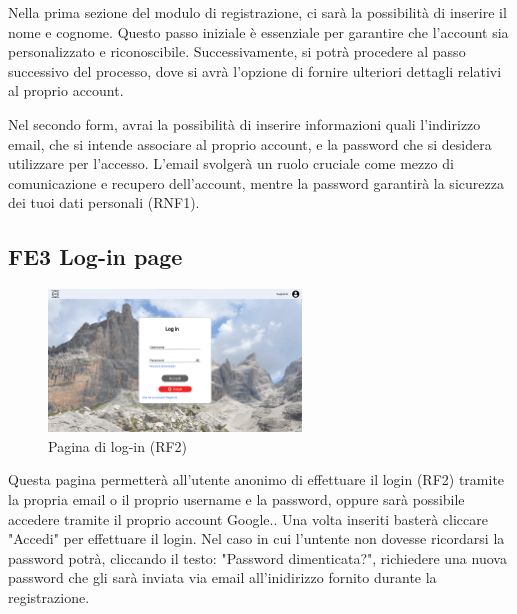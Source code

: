 \documentclass[a4paper,12pt]{article}
\begin{document}
Nella prima sezione del modulo di registrazione, ci sarà la possibilità di inserire il nome e cognome. Questo passo iniziale è essenziale per garantire che l'account sia personalizzato e riconoscibile. Successivamente, si potrà procedere al passo successivo del processo, dove si avrà l'opzione di fornire ulteriori dettagli relativi al proprio account.

Nel secondo form, avrai la possibilità di inserire informazioni quali l'indirizzo email, che si intende associare al proprio account, e la password che si desidera utilizzare per l'accesso. L'email svolgerà un ruolo cruciale come mezzo di comunicazione e recupero dell'account, mentre la password garantirà la sicurezza dei tuoi dati personali (RNF1).





\subsection*{FE3 Log-in page}
\begin{figure}[H]
   \centering
    \includegraphics[width=0.6\textwidth]{img/Log-in.png}
    \caption{Pagina di log-in (RF2)}
\end{figure}
Questa pagina permetterà all'utente anonimo di effettuare il login (RF2) tramite la propria email o il proprio username e la password, oppure sarà possibile accedere tramite il proprio account Google.. Una volta inseriti basterà cliccare "Accedi" per effettuare il login. Nel caso in cui l'untente non dovesse ricordarsi la password potrà, cliccando il testo: "Password dimenticata?", richiedere una nuova password che gli sarà inviata via email all'inidirizzo fornito durante la registrazione.
\end{document}
